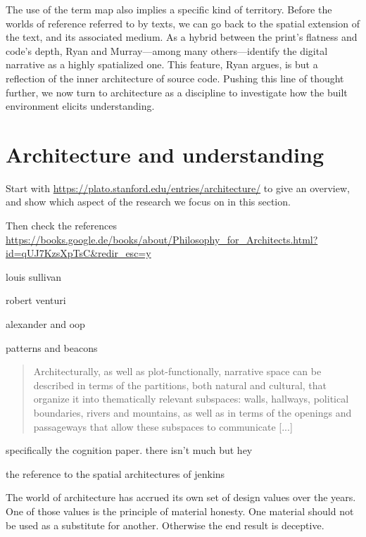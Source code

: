 The use of the term map also implies a specific kind of territory. Before the worlds of reference referred to by texts, we can go back to the spatial extension of the text, and its associated medium. As a hybrid between the print's flatness and code's depth, Ryan and Murray—among many others—identify the digital narrative as a highly spatialized one. This feature, Ryan argues, is but a reflection of the inner architecture of source code. Pushing this line of thought further, we now turn to architecture as a discipline to investigate how the built environment elicits understanding.

\section{Architecture and understanding}
\label{sec:arch-understanding}


Start with \url{https://plato.stanford.edu/entries/architecture/} to give an overview, and show which aspect of the research we focus on in this section.

Then check the references \url{https://books.google.de/books/about/Philosophy_for_Architects.html?id=qUJ7KzsXpTsC&redir_esc=y}


louis sullivan

robert venturi


alexander and oop

patterns and beacons

\begin{quote}
    Architecturally, as well as plot-functionally, narrative space can be described in terms of the partitions, both natural and cultural, that organize it into thematically relevant subspaces: walls, hallways, political boundaries, rivers and mountains, as well as in terms of the openings and passageways that allow these subspaces to communicate [...] \citep{ryan_space_2009}
\end{quote}


specifically the cognition paper. there isn't much but hey

the reference to the spatial architectures of jenkins


The world of architecture has accrued its own set of design values over the years. One of those values is the principle of material honesty. One material should not be used as a substitute for another. Otherwise the end result is deceptive.\citep{keith_resilient_2016}

